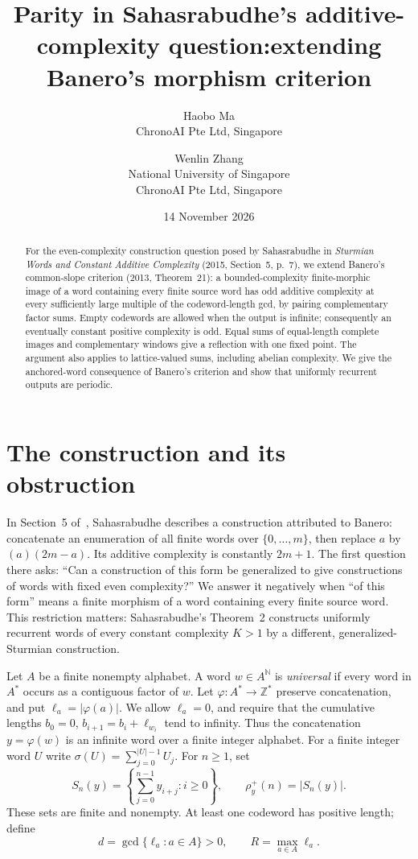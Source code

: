\documentclass[11pt]{article}
\title{Parity in Sahasrabudhe's additive-complexity question:\newline extending Banero's morphism criterion}
\author{Haobo Ma\\\small ChronoAI Pte Ltd, Singapore
\and Wenlin Zhang\\\small National University of Singapore\\\small ChronoAI Pte Ltd, Singapore}
\date{14 November 2026}
\newcommand{\Z}{\mathbb Z}
\newcommand{\N}{\mathbb N}
\newcommand{\sumword}[1]{\sigma(#1)}
\begin{document}
\maketitle
\begin{abstract}
For the even-complexity construction question posed by Sahasrabudhe in
\emph{Sturmian Words and Constant Additive Complexity} (2015, Section~5,
p.~7), we extend Banero's common-slope criterion (2013, Theorem~21): a
bounded-complexity finite-morphic image of a word containing every finite
source word has odd additive complexity at every sufficiently large
multiple of the codeword-length gcd, by pairing complementary factor sums.
Empty codewords are allowed when the output is infinite; consequently an
eventually constant positive complexity is odd. Equal sums of equal-length
complete images and complementary windows give a reflection with one
fixed point. The argument also applies to lattice-valued sums, including
abelian complexity. We give the anchored-word consequence of Banero's
criterion and show that uniformly recurrent outputs are periodic.
\end{abstract}

\section{The construction and its obstruction}
In Section~5 of~\cite{sahas}, Sahasrabudhe describes a construction attributed
to Banero: concatenate an enumeration of all finite words over
$\{0,\ldots,m\}$, then replace $a$ by $(a)(2m-a)$. Its additive complexity
is constantly $2m+1$. The first question there asks: ``Can a construction
of this form be generalized to give constructions of words with fixed
even complexity?'' We answer it negatively when
``of this form'' means a finite morphism of a word containing every finite
source word. This restriction matters: Sahasrabudhe's Theorem~2 constructs
uniformly recurrent words of every constant complexity $K>1$ by a different,
generalized-Sturmian construction.

Let $A$ be a finite nonempty alphabet. A word $w\in A^{\N}$ is
\emph{universal} if every word in $A^*$ occurs as a contiguous factor of $w$.
Let $\varphi:A^*\to\Z^*$ preserve concatenation, and put
$\ell_a=|\varphi(a)|$. We allow $\ell_a=0$, and require that the cumulative
lengths $b_0=0$, $b_{i+1}=b_i+\ell_{w_i}$ tend to infinity.
Thus the concatenation $y=\varphi(w)$ is an infinite word over a finite
integer alphabet. For a finite integer word $U$ write
$\sumword{U}=\sum_{j=0}^{|U|-1}U_j$. For $n\geq1$, set
\[
 S_n(y)=\left\{\sum_{j=0}^{n-1}y_{i+j}:i\geq0\right\},
 \qquad \rho_y^+(n)=|S_n(y)|.
\]
These sets are finite and nonempty. At least one codeword has positive
length; define
\[
 d=\gcd\{\ell_a:a\in A\}>0,
 \qquad R=\max_{a\in A}\ell_a.
\]
\end{document}

